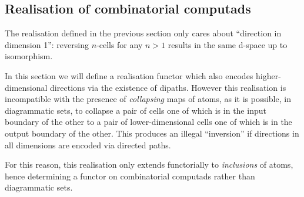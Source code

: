 \begin{center}
\end{center}

\subsection{Realisation of combinatorial computads}

The realisation defined in the previous section only cares about ``direction in dimension 1'': reversing \( n \)-cells for any \( n > 1 \) results in the same d-space up to isomorphism.

In this section we will define a realisation functor which also encodes higher-dimensional directions via the existence of dipaths.
However this realisation is incompatible with the presence of \emph{collapsing} maps of atoms, as it is possible, in diagrammatic sets, to collapse a pair of cells one of which is in the input boundary of the other to a pair of lower-dimensional cells one of which is in the output boundary of the other.
This produces an illegal ``inversion'' if directions in all dimensions are encoded via directed paths.

For this reason, this realisation only extends functorially to \emph{inclusions} of atoms, hence determining a functor on combinatorial computads rather than diagrammatic sets.

